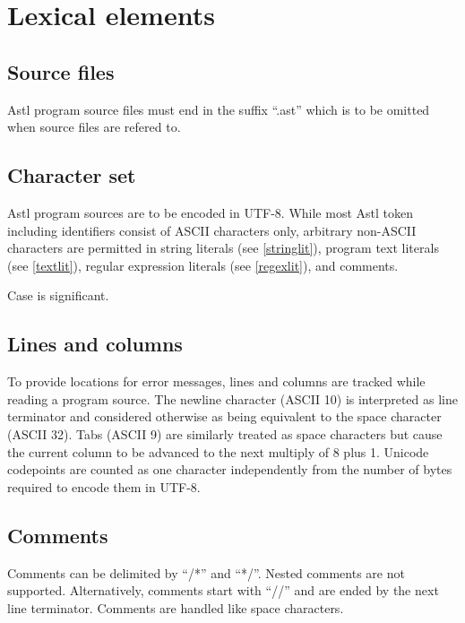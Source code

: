 \chapter{Lexical elements}

\section{Source files}

Astl program source files must end in the
suffix ``.ast'' which is to be omitted when
source files are refered to.

\section{Character set}

Astl program sources are to be encoded in UTF-8. While
most Astl token including identifiers consist of ASCII
characters only, arbitrary non-ASCII characters are permitted in
string literals (see \ref{stringlit}), program text literals (see
\ref{textlit}), regular expression literals (see \ref{regexlit}), and
comments.

Case is significant.

\section{Lines and columns}\label{lines}

To provide locations for error messages,
lines and columns are tracked while reading a
program source. The newline character
(ASCII 10) is interpreted as line terminator
and considered otherwise as being equivalent to the space
character (ASCII 32). Tabs (ASCII 9) are similarly treated as
space characters but cause the current column to be advanced to the next
multiply of 8 plus 1. Unicode codepoints are counted
as one character independently from the number of bytes required to encode
them in UTF-8.

\section{Comments}

Comments can be delimited by ``/*'' and ``*/''. Nested comments
are not supported. Alternatively, comments start with ``//'' and
are ended by the next line terminator.
Comments are handled like space characters.

